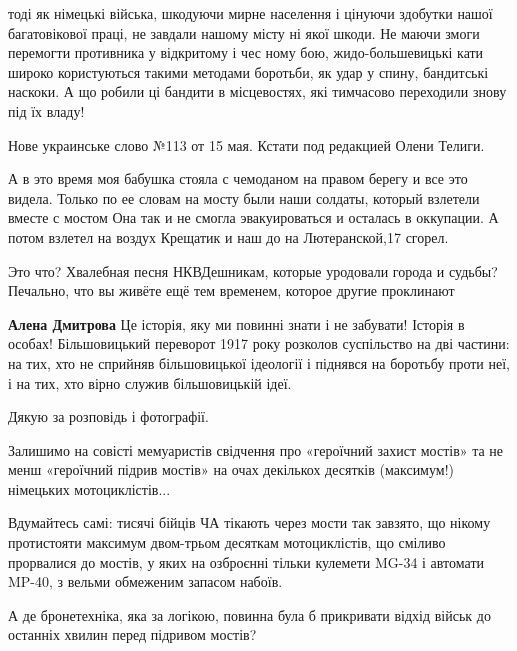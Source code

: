 \begin{itemize}
\begin{itemize}

тоді як німецькі війська, шкодуючи мирне населення і цінуючи здобутки нашої
багатовікової праці, не завдали нашому місту ні якої шкоди. Не маючи змоги
перемогти противника у відкритому і чес ному бою, жидо-большевицькі кати широко
користуються такими методами боротьби, як удар у спину, бандитські наскоки. А
що робили ці бандити в місцевостях, які тимчасово переходили знову під їх
владу!

Нове украинське слово №113 от 15 мая. Кстати под редакцией Олени Телиги.
\end{itemize} %


А в это время моя бабушка стояла с чемоданом на правом берегу и все это видела.
Только по ее словам на мосту были наши солдаты, который взлетели вместе с
мостом Она так и не смогла эвакуироваться и осталась в оккупации. А потом
взлетел на воздух Крещатик и наш до на Лютеранской,17 сгорел.



Это что? Хвалебная песня НКВДешникам, которые уродовали города и судьбы?
Печально, что вы живёте ещё тем временем, которое другие проклинают

\begin{itemize} %
\textbf{Алена Дмитрова} Це історія, яку ми повинні знати і не забувати! Історія в особах! Більшовицький переворот 1917 року розколов суспільство на дві частини: на тих, хто не сприйняв більшовицької ідеології і піднявся на боротьбу проти неї, і на тих, хто вірно служив більшовицькій ідеї.
\end{itemize} %

Дякую за розповідь і фотографії.


Залишимо на совісті мемуаристів свідчення про «героїчний захист мостів» та не
менш «героїчний підрив мостів» на очах декількох десятків (максимум!) німецьких
мотоциклістів...

Вдумайтесь самі: тисячі бійців ЧА тікають через мости так завзято, що нікому
протистояти максимум двом-трьом десяткам мотоциклістів, що сміливо прорвалися
до мостів, у яких на озброєнні тільки кулемети MG-34 і автомати MP-40, з вельми
обмеженим запасом набоїв.

А де бронетехніка, яка за логікою, повинна була б прикривати відхід військ до
останніх хвилин перед підривом мостів?


\end{itemize}
